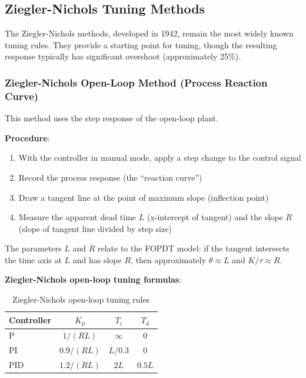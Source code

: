 \subsection{Ziegler-Nichols Tuning Methods}
\label{subsec:zn_tuning}

The Ziegler-Nichols methods, developed in 1942, remain the most widely known tuning rules. They provide a starting point for tuning, though the resulting response typically has significant overshoot (approximately 25\%).

\subsubsection{Ziegler-Nichols Open-Loop Method (Process Reaction Curve)}

This method uses the step response of the open-loop plant.

\textbf{Procedure}:
\begin{enumerate}
    \item With the controller in manual mode, apply a step change to the control signal
    \item Record the process response (the ``reaction curve'')
    \item Draw a tangent line at the point of maximum slope (inflection point)
    \item Measure the apparent dead time $L$ (x-intercept of tangent) and the slope $R$ (slope of tangent line divided by step size)
\end{enumerate}

The parameters $L$ and $R$ relate to the FOPDT model: if the tangent intersects the time axis at $L$ and has slope $R$, then approximately $\theta \approx L$ and $K/\tau \approx R$.

\textbf{Ziegler-Nichols open-loop tuning formulas}:

\begin{table}[htbp]
\centering
\caption{Ziegler-Nichols open-loop tuning rules}
\label{tab:zn_open_loop}
\begin{tabular}{@{}lccc@{}}
\toprule
\textbf{Controller} & $K_p$ & $T_i$ & $T_d$ \\
\midrule
P & $1/(RL)$ & $\infty$ & 0 \\
PI & $0.9/(RL)$ & $L/0.3$ & 0 \\
PID & $1.2/(RL)$ & $2L$ & $0.5L$ \\
\bottomrule
\end{tabular}
\end{table}

